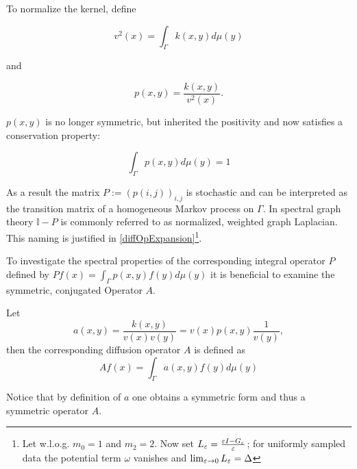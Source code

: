 To normalize the kernel, define
\begin{definition}\label{def:normFunc}
$$v^2(x)=\int_\Gamma k(x,y)d\mu(y)$$
\end{definition}
and
\begin{definition}
$$p(x,y)=\frac{k(x,y)}{v^2(x)}.$$
\end{definition}
$p(x,y)$ is no longer symmetric, but inherited the positivity and now satisfies a conservation property:

\begin{equation*}
\int_\Gamma p(x,y)d\mu(y)=1
\end{equation*}

As a result the matrix $P:=(p(i,j))_{i,j}$ is stochastic and can be interpreted as the transition matrix of a homogeneous Markov process on $\Gamma$. In spectral graph theory $\mathbb{I}-P$ is commonly referred to as normalized, weighted graph Laplacian. This naming is justified in \ref{diffOpExpansion}\footnote{Let w.l.o.g. $m_0=1$ and $m_2=2$. Now set $L_\varepsilon = \frac{\varepsilon I - G_\varepsilon}{\varepsilon}$; for uniformly sampled data the potential term $\omega$ vanishes and $\lim_{\varepsilon\rightarrow 0} L_\varepsilon = \Delta$}.

To investigate the spectral properties of the corresponding integral operator $P$ defined by $Pf(x)=\int_\Gamma p(x,y)f(y)d\mu(y)$ it is beneficial to examine the symmetric, conjugated Operator $A$.

\begin{definition}
Let $$a(x,y)=\frac{k(x,y)}{v(x)v(y)}=v(x)p(x,y)\frac{1}{v(y)},$$ then the corresponding diffusion operator $A$ is defined as $$Af(x)=\int_\Gamma a(x,y)f(y)d\mu(y)$$
\end{definition}

Notice that by definition of $a$ one obtains a symmetric form and thus a symmetric operator $A$.

